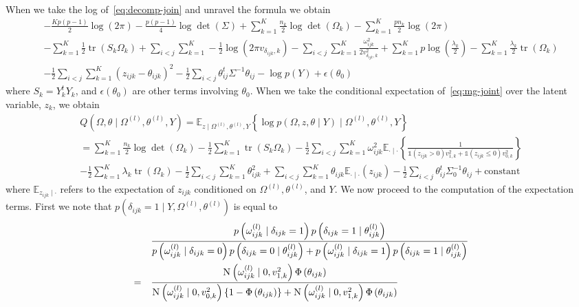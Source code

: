 \documentclass[a4paper, 11pt, oneside]{report}
\DeclareMathOperator{\tr}{tr}
\newcommand{\E}{\mathbb{E}}
\newcommand{\1}{\mathds{1}}
\newcommand{\powl}{^{(l)}}
\newcommand{\inv}{^{-1}}
\newcommand{\Nor}{\textsc{N}}
\begin{document}
When we take the log of~\eqref{eq:decomp-join} and unravel the formula we obtain
\begin{multline}\label{eq:mg-joint}
  - \frac{Kp(p-1)}{2} \log(2\pi) - \frac{p(p-1)}{4} \log\det(\Sigma) + \sum_{k=1}^K \frac{n_k}{2} \log\det(\Omega_k) - \sum_{k=1}^K \frac{p n_k}{2} \log(2 \pi)  \\
  -\sum_{k=1}^K\frac{1}{2} \tr(S_k \Omega_k) + \sum_{i < j}\sum_{k=1}^K -\frac{1}{2} \log(2 \pi v_{\delta_{ijk}, k}) - \sum_{i < j} \sum_{k=1}^K\frac{\omega_{ijk}^2}{2 v_{\delta_{ijk}, k}^2} + \sum_{k=1}^K p \log\left(\frac{\lambda_k}{2}\right) - \sum_{k=1}^K \frac{\lambda_k}{2} \tr(\Omega_k)  \\
	-\frac{1}{2} \sum_{i < j}\sum_{k=1}^K (z_{ijk} - \theta_{ijk})^2  -\frac{1}{2} \sum_{i < j} \theta_{ij}^t \Sigma\inv \theta_{ij} - \log p(Y) + \epsilon(\theta_0)
\end{multline}
where $S_k = Y_k^t Y_k$, and $\epsilon(\theta_0)$ are other terms involving $\theta_0$.
When we take the conditional expectation of~\eqref{eq:mg-joint} over the latent
variable, $z_k$, we obtain
\begin{multline}\label{eq:mg-exp}
	Q(\Omega, \theta \mid \Omega\powl, \theta\powl, Y) =  \E_{z \mid
  \Omega\powl, \theta\powl, Y}\left\{\log
	p(\Omega,  z, \theta \mid Y) \mid
\Omega\powl, \theta\powl, Y\right\}                    \\
= \sum_{k=1}^K \frac{n_k}{2} \log \det(\Omega_k) - \frac{1}{2} \sum_{k=1}^K \tr(S_k \Omega_k) - \frac{1}{2} \sum_{i < j} \sum_{k=1}^K \omega_{ijk}^2 \E_{\cdot \mid \cdot} \left\{\frac{1}{\1(z_{ijk} > 0) v_{1,k}^2 + \1(z_{ijk} \leq 0) v_{0,k}^2}\right\} \\
- \frac{1}{2} \sum_{k=1}^K \lambda_k \tr(\Omega_k)  -\frac{1}{2} \sum_{i < j} \sum_{k = 1}^K \theta_{ijk}^2 + \sum_{i < j} \sum_{k=1}^K \theta_{ijk} \E_{\cdot \mid \cdot}(z_{ijk}) - \frac{1}{2} \sum_{i < j} \theta_{ij}^t \Sigma_0\inv \theta_{ij} + \text{constant}
\end{multline}
where $\E_{z_{ijk} \mid \cdot}$ refers to the expectation of $z_{ijk}$ conditioned on
$\Omega\powl, \theta\powl$, and $Y$.
We now proceed to the computation of the expectation terms.
First we note that $p(\delta_{ijk} = 1 \mid Y, \Omega\powl, \theta\powl)$
is equal to
\begin{align*}
	       & \frac{p\left(\omega_{ijk}\powl \mid \delta_{ijk}=1\right) p\left(\delta_{ijk}=1 \mid
		\theta_{ijk}\powl\right)}{p\left(\omega_{ijk}\powl \mid \delta_{ijk}=0\right) p\left(\delta_{ijk}=0 \mid
		\theta_{ijk}\powl\right) + p\left(\omega_{ijk}\powl \mid \delta_{ijk}=1\right) p\left(\delta_{ijk}=1 \mid
	\theta_{ijk}\powl\right)}                                                                     \\
	=\quad & \frac{\Nor\left(\omega_{ijk}\powl \mid 0,
      v_{1,k}^2\right)\Phi\left(\theta_{ijk}\right)}{\Nor\left(\omega_{ijk}\powl \mid 0,
    v_{0,k}^2\right)\{1 -
		\Phi\left(\theta_{ijk}\right)\} +
    \Nor\left(\omega_{ijk}\powl \mid 0, v_{1,k}^2\right)
		\Phi\left(\theta_{ijk}\right)}
\end{align*}
\end{document}
